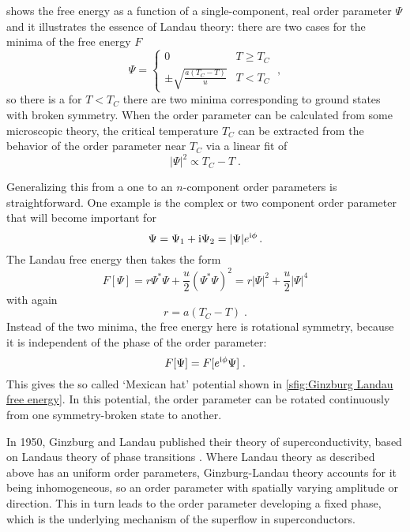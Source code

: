 \documentclass[../notes.tex]{subfiles}
\begin{document}
 shows the free energy as a function of a single-component, real order parameter \(\Psi\) and it illustrates the essence of Landau theory: there are two cases for the minima of the free energy \(F\)
\begin{equation}
	\Psi = \begin{cases}
		0 & T \geq T_C \\
		\pm \sqrt{\frac{a (T_C - T)}{u}} & T < T_C
	\end{cases} \;,
\end{equation}
so there is a for \(T < T_C\) there are two minima corresponding to ground states with broken symmetry.
When the order parameter can be calculated from some microscopic theory, the critical temperature \(T_C\) can be extracted from the behavior of the order parameter near \(T_C\) via a linear fit of
\begin{equation}
	\vert \Psi \vert^2 \propto T_C - T \;.
\end{equation}

Generalizing this from a one to an \(n\)-component order parameters is straightforward.
One example is the complex or two component order parameter that will become important for 
\begin{equation}
	\Psi = \Psi_1 + \mathrm{i} \Psi_2 = \vert \Psi \vert e^{\mathrm{i} \phi} \,.
\end{equation}
The Landau free energy then takes the form
\begin{equation}
	F [\Psi] = r \Psi^* \Psi + \frac{u}{2} (\Psi^* \Psi)^2 = r \vert \Psi \vert^2 + \frac{u}{2} \vert \Psi \vert^4
\end{equation}
with again
\begin{equation}
	r = a(T_C - T) \;.
\end{equation}
Instead of the two minima, the free energy here is rotational symmetry, because it is independent of the phase of the order parameter: 
\begin{equation}
	F [\Psi] = F [e^{\mathrm{i} \phi} \Psi] \;.
\end{equation}
This gives the so called `Mexican hat' potential shown in \cref{sfig:Ginzburg Landau free energy}.
In this potential, the order parameter can be rotated continuously from one symmetry-broken state to another.

In 1950, Ginzburg and Landau published their theory of superconductivity, based on Landaus theory of phase transitions \cite{ginzburgTheorySuperconductivity1950}.
Where Landau theory as described above has an uniform order parameters, Ginzburg-Landau theory accounts for it being inhomogeneous, so an order parameter with spatially varying amplitude or direction.
This in turn leads to the order parameter developing a fixed phase, which is the underlying mechanism of the superflow in superconductors.
\end{document}
